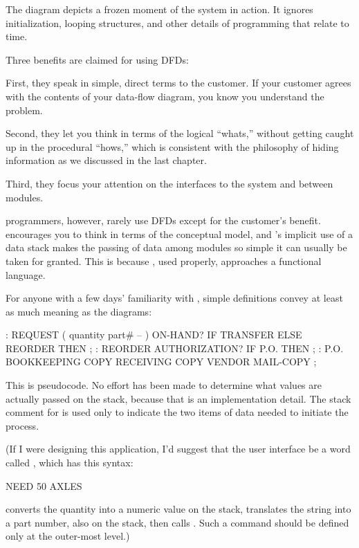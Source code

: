 The diagram depicts a frozen moment of the system in action. It
ignores initialization, looping structures, and other details of
programming that relate to time.

Three benefits are claimed for using DFDs:

First, they speak in simple, direct terms to the customer. If your
customer agrees with the contents of your data-flow diagram, you know
you understand the problem.

Second, they let you think in terms of the logical ``whats,'' without
getting caught up in the procedural ``hows,'' which is consistent with
the philosophy of hiding information as we discussed in the last chapter.

Third, they focus your attention on the interfaces to the system and
between modules.

\Forth{} programmers, however, rarely use DFDs except for the customer's
benefit. \Forth{} encourages you to think in terms of the conceptual
model, and \Forth{}'s implicit use of a data stack makes the passing of
data among modules so simple it can usually be taken for granted.
This is because \Forth{}, used properly, approaches a functional language.

For anyone with a few days' familiarity with \Forth{}, simple definitions
convey at least as much meaning as the diagrams:
\begin{Code}
: REQUEST  ( quantity part# -- )
   ON-HAND?  IF  TRANSFER  ELSE  REORDER  THEN ;
: REORDER   AUTHORIZATION?  IF  P.O.  THEN ;
: P.O.   BOOKKEEPING COPY   RECEIVING COPY
   VENDOR MAIL-COPY ;
\end{Code}
This is \Forth{} pseudocode. No effort has been made to determine what
values are actually passed on the stack, because that is an
implementation detail. The stack comment for  is used
only to indicate the two items of data needed to initiate the process.

(If I were designing this application, I'd suggest that the user
interface be a word called , which has this syntax:

\begin{Code}
NEED 50 AXLES
\end{Code}

\noindent {} converts the quantity into a numeric value on
the stack, translates the string  into a part number,
also on the stack, then calls . Such a command should
be defined only at the outer-most level.)

